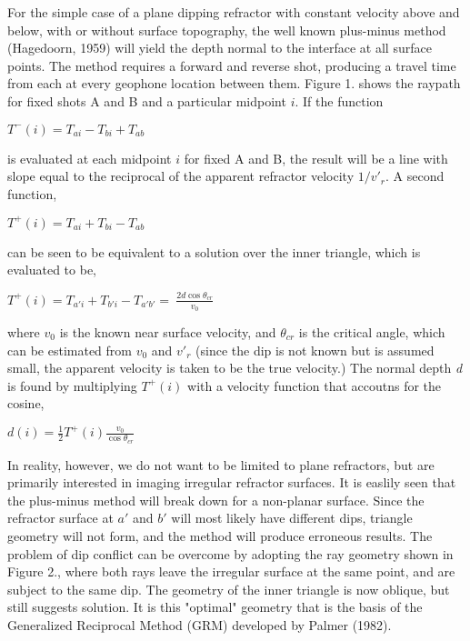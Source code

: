{For the simple case of a plane dipping refractor with constant velocity
above and below, with or without surface topography, the well known plus-minus 
method (Hagedoorn, 1959) will yield the depth normal to the interface
at all surface points.  The method requires a forward and reverse shot,
producing a travel time from each at every geophone location between them.
Figure 1. shows the raypath for fixed shots A and B and a particular midpoint
$i$.  If the function
	\begin{center}		
	\( T^{-}(i) =  T_{ai}-T_{bi}+T_{ab} \)
	\end{center}
is evaluated at each midpoint $i$ for
fixed A and B, the result will be a line with slope equal to the reciprocal 
of the apparent refractor velocity $ 1/v'_{r}$.  A second function, 
	\begin{center}
	\( T^{+}(i) = T_{ai}+T_{bi}-T_{ab} \)
	\end{center}
can be seen to be equivalent to a solution over the inner triangle, which is
evaluated to be,
	\begin{center}
	\( T^{+}(i) = T_{a'i}+T_{b'i}-T_{a'b'} =
	\ \displaystyle{\frac{2d\cos\theta_{cr}}{v_{0}}} \)
	\end{center}
where $v_{0}$ is the known near surface velocity, 
and $\theta_{cr}$ is the critical angle, which can be estimated from
$v_{0}$ and $v'_{r}$ 
(since the dip is not known but is assumed small, the apparent velocity is 
taken to be the true velocity.) 
The normal depth \textit{d} is found by multiplying $T^{+}(i)$ with a 
velocity function that accoutns for the cosine, 
	\begin{center}
	\(d(i) = \frac{1}{2} T^{+}(i)\displaystyle{\frac{v_{0}}{\cos\theta_{cr}}} \)
	\end{center}
In reality, however, we do not want to be limited to plane refractors, but are primarily 
interested in imaging irregular refractor surfaces.  It is easlily seen
that the plus-minus method will break down for a non-planar surface.  Since the 
refractor surface 
at $a'$ and $b'$ will most likely have different dips, triangle geometry will
not form, and the method will produce erroneous results.  
The problem of dip conflict can be overcome by adopting the ray geometry shown
in Figure 2., where both rays leave the irregular surface at the same point,
and are subject to the same dip.  The geometry of the inner triangle is
now oblique, but still suggests solution.   It is this "optimal" geometry that
is the basis of the Generalized Reciprocal Method (GRM) developed by 
Palmer (1982).

}
